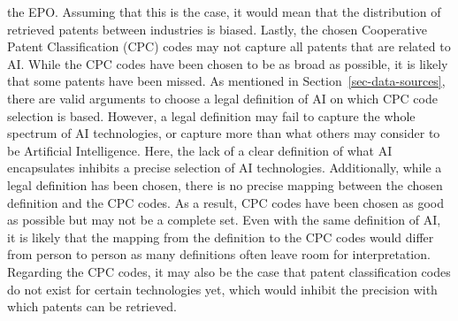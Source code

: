 \documentclass[
  12pt,
  a4paperpaper,
]{article}
\begin{document}
the EPO. Assuming that this is the case, it would mean that the
distribution of retrieved patents between industries is biased. Lastly,
the chosen Cooperative Patent Classification (CPC) codes may not capture
all patents that are related to AI. While the CPC codes have been chosen
to be as broad as possible, it is likely that some patents have been
missed. As mentioned in Section~\ref{sec-data-sources}, there are valid
arguments to choose a legal definition of AI on which CPC code selection
is based. However, a legal definition may fail to capture the whole
spectrum of AI technologies, or capture more than what others may
consider to be Artificial Intelligence. Here, the lack of a clear
definition of what AI encapsulates inhibits a precise selection of AI
technologies. Additionally, while a legal definition has been chosen,
there is no precise mapping between the chosen definition and the CPC
codes. As a result, CPC codes have been chosen as good as possible but
may not be a complete set. Even with the same definition of AI, it is
likely that the mapping from the definition to the CPC codes would
differ from person to person as many definitions often leave room for
interpretation. Regarding the CPC codes, it may also be the case that
patent classification codes do not exist for certain technologies yet,
which would inhibit the precision with which patents can be retrieved.
\end{document}
